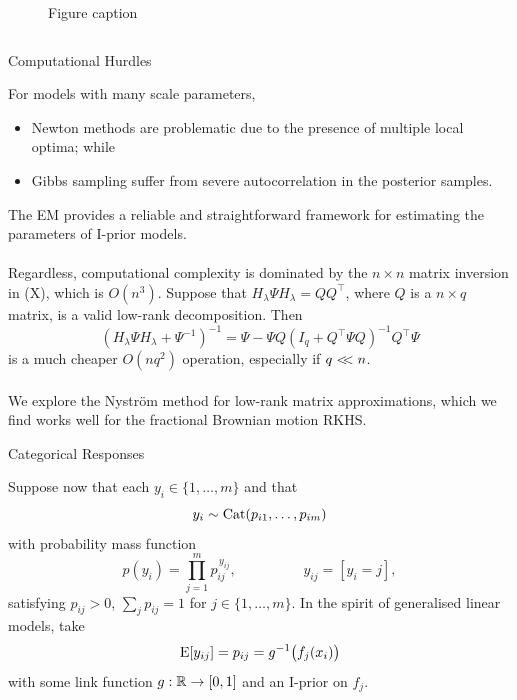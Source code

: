\documentclass{beamer}
\newlength{\onecolwid}
\newlength{\twocolwid}
\begin{document}
\begin{frame}[t]
\begin{columns}[t]
\begin{column}{\twocolwid}
\begin{figure}
\caption{Figure caption}
\end{figure}



\begin{columns}[t,totalwidth=\twocolwid]  %
\begin{column}{\onecolwid}  %



\begin{block}{Computational Hurdles}

For models with many scale parameters, 
\begin{itemize}
  \item Newton methods are problematic due to the presence of multiple local optima; while  
  \item Gibbs sampling suffer from severe autocorrelation in the posterior samples.
\end{itemize}
The EM provides a reliable and straightforward framework for estimating the parameters of I-prior models.
\\~\\[-0.8ex]
Regardless, computational complexity is dominated by the $n \times n$ matrix inversion in (X), which is $O(n^3)$. Suppose that $H_\lambda \Psi H_\lambda = QQ^\top$, where $Q$ is a $n \times q$ matrix, is a valid low-rank decomposition. Then
\[
  (H_\lambda \Psi H_\lambda + \Psi^{-1})^{-1} = \Psi - \Psi Q (I_q + Q^\top \Psi Q)^{-1} Q^\top \Psi
\]
is a much cheaper $O(nq^2)$ operation, especially if $q <\!\!< n$.
\\~\\[-0.8ex]
We explore the Nyström method for low-rank matrix approximations, which we find works well for the fractional Brownian motion RKHS.

\end{block}



\begin{block}{Categorical Responses}

Suppose now that each $y_i \in \{ 1,\dots,m \}$ and that 
\[
  y_i \sim \operatorname{Cat}(p_{i1},\dots,p_{im})
\]
with probability mass function
\[
  p(y_i) = \prod_{j=1}^m p_{ij}^{\, y_{ij}}, \hspace{2cm} y_{ij} = [y_i = j],
\]  
satisfying $p_{ij} > 0$, $\sum_j p_{ij} = 1$ for $j \in \{ 1,\dots,m \}$.
In the spirit of generalised linear models, take
\[
  \operatorname{E}[y_{ij}] = p_{ij} = g^{-1}\big(f_j(x_i)\big)
\]
with some link function $g:\mathbb{R} \to [0,1]$ and an I-prior on $f_j$.
 

\end{block}
\end{column}
\end{columns}
\end{column}
\end{columns}
\end{frame}
\end{document}
